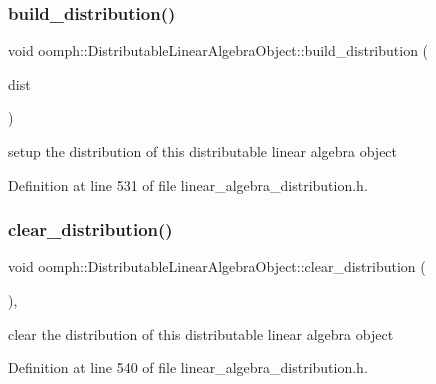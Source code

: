 \subsubsection{\texorpdfstring{build\+\_\+distribution()}{build\_distribution()}\hspace{0.1cm}{\footnotesize\ttfamily [2/2]}}
{\footnotesize\ttfamily void oomph\+::\+Distributable\+Linear\+Algebra\+Object\+::build\+\_\+distribution (\begin{DoxyParamCaption}\item[{const \hyperlink{classoomph_1_1LinearAlgebraDistribution}{Linear\+Algebra\+Distribution} \&}]{dist }\end{DoxyParamCaption})\hspace{0.3cm}{\ttfamily [inline]}}



setup the distribution of this distributable linear algebra object 



Definition at line 531 of file linear\+\_\+algebra\+\_\+distribution.\+h.

\mbox{\label{classoomph_1_1DistributableLinearAlgebraObject_a30742aa2ac9abcfa037179f2d28ff43a}} 
\subsubsection{\texorpdfstring{clear\+\_\+distribution()}{clear\_distribution()}}
{\footnotesize\ttfamily void oomph\+::\+Distributable\+Linear\+Algebra\+Object\+::clear\+\_\+distribution (\begin{DoxyParamCaption}{ }\end{DoxyParamCaption})\hspace{0.3cm}{\ttfamily [inline]}, {\ttfamily [protected]}}



clear the distribution of this distributable linear algebra object 



Definition at line 540 of file linear\+\_\+algebra\+\_\+distribution.\+h.



